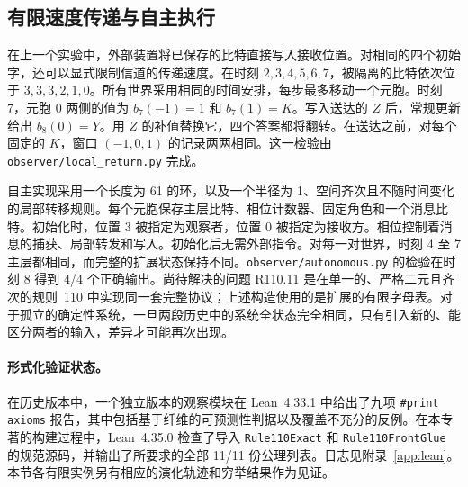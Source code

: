 \subsection{有限速度传递与自主执行}

在上一个实验中，外部装置将已保存的比特直接写入接收位置。对相同的四个初始字，还可以显式限制信道的传递速度。在时刻 $2,3,4,5,6,7$，被隔离的比特依次位于 $3,3,3,2,1,0$。所有世界采用相同的时间安排，每步最多移动一个元胞。时刻 7，元胞 $0$ 两侧的值为 $b_7(-1)=1$ 和 $b_7(1)=K$。写入送达的 $Z$ 后，常规更新给出 $b_8(0)=Y$。用 $Z$ 的补值替换它，四个答案都将翻转。在送达之前，对每个固定的 $K$，窗口 $(-1,0,1)$ 的记录两两相同。这一检验由 \nolinkurl{observer/local_return.py} 完成。

自主实现采用一个长度为 61 的环，以及一个半径为 1、空间齐次且不随时间变化的局部转移规则。每个元胞保存主层比特、相位计数器、固定角色和一个消息比特。初始化时，位置 3 被指定为观察者，位置 0 被指定为接收方。相位控制着消息的捕获、局部转发和写入。初始化后无需外部指令。对每一对世界，时刻 4 至 7 主层都相同，而完整的扩展状态保持不同。\nolinkurl{observer/autonomous.py} 的检验在时刻 8 得到 4/4 个正确输出。尚待解决的问题 R110.11 是在单一的、严格二元且齐次的规则~110 中实现同一套完整协议；上述构造使用的是扩展的有限字母表。对于孤立的确定性系统，一旦两段历史中的系统全状态完全相同，只有引入新的、能区分两者的输入，差异才可能再次出现。

\paragraph{形式化验证状态。}
在历史版本中，一个独立版本的观察模块在 Lean~4.33.1 中给出了九项 \texttt{\#print axioms} 报告，其中包括基于纤维的可预测性判据以及覆盖不充分的反例。在本专著的构建过程中，Lean~4.35.0 检查了导入 \texttt{Rule110Exact} 和 \texttt{Rule110FrontGlue} 的规范源码，并输出了所要求的全部 11/11 份公理列表。日志见附录~\ref{app:lean}。本节各有限实例另有相应的演化轨迹和穷举结果作为见证。
